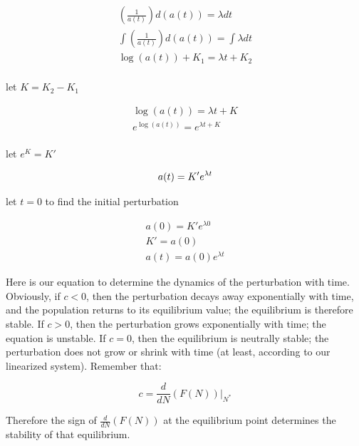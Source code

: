 \documentclass[12pt]{article}
\begin{document}
\begin{equation}
\begin{split}
(\frac{1}{a(t)})d(a(t)) = \lambda dt\\
\int (\frac{1}{a(t)})d(a(t)) = \int \lambda dt\\
\log(a(t)) + K_{1} = \lambda t + K_{2}\\
\end{split}
\end{equation}

let $K = K_{2} - K_{1}$

\begin{equation}
\begin{split}
\log(a(t)) = \lambda t + K\\
e^{\log(a(t))} = e^{\lambda t + K}\\
\end{split}
\end{equation}

let $e^{K} = K'$

\begin{equation}
a(t) = K' e^{\lambda t}\\
\end{equation}

let $t=0$ to find the initial perturbation

\begin{equation}
\begin{split}
a(0) = K' e^{\lambda 0}\\
K' = a(0)\\
a(t) = a(0) e^{\lambda t}
\end{split}
\end{equation}

Here is our equation to determine the dynamics of the perturbation with time. Obviously, if $c<0$, then the perturbation decays away exponentially with time, and the population returns to its equilibrium value; the equilibrium is therefore stable. If $c>0$, then the perturbation grows exponentially with time; the equation is unstable. If $c=0$, then the equilibrium is neutrally stable; the perturbation does not grow or shrink with time (at least, according to our linearized system). Remember that:

\begin{equation}
c = \frac{d}{dN}(F(N))|_{N^{*}}
\end{equation}

Therefore the sign of $\frac{d}{dN}(F(N))$ at the equilibrium point determines the stability of that equilibrium.
\end{document}
